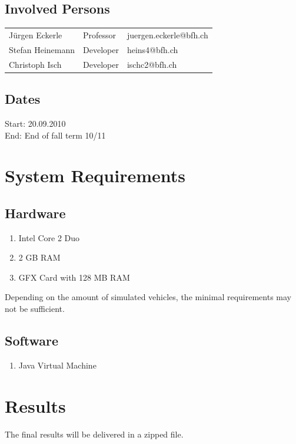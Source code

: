 \documentclass[a4paper,10pt,titlepage]{article}
\begin{document}
\subsection{Involved Persons}

\begin{tabularx}{\textwidth}{XXX}
 Jürgen Eckerle & Professor & juergen.eckerle@bfh.ch \\
 Stefan Heinemann & Developer & heins4@bfh.ch \\
 Christoph Isch & Developer & ischc2@bfh.ch \\
\end{tabularx}

\subsection{Dates}

Start: 20.09.2010 \\
End: End of fall term 10/11

\section{System Requirements}

\subsection{Hardware}
\begin{enumerate}
 \item Intel Core 2 Duo
 \item 2 GB RAM
 \item GFX Card with 128 MB RAM
\end{enumerate}

Depending on the amount of simulated vehicles, the minimal requirements may not be sufficient.


\subsection{Software}
\begin{enumerate}
 \item Java Virtual Machine
\end{enumerate}


\section{Results}

The final results will be delivered in a zipped file.
\end{document}
